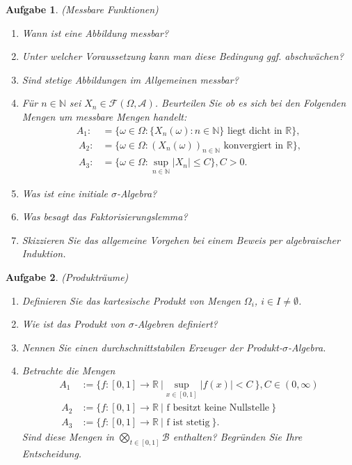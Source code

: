 \documentclass[11pt, a4paper, ngerman]{article}
\newcommand{\N}{\mathbb{N}}
\newcommand{\R}{\mathbb{R}}
\newtheorem{aufgabe}{Aufgabe}
\begin{document}
\begin{aufgabe} (Messbare Funktionen)
    \begin{enumerate}
        \item
        Wann ist eine Abbildung messbar? 
        \item 
        Unter welcher Voraussetzung kann man diese Bedingung ggf. abschwächen? 
        \item 
        Sind stetige Abbildungen im Allgemeinen messbar? 
        \item 
        Für $n \in \N$ sei $X_n \in \mathcal{F}(\Omega, \mathcal{A})$. Beurteilen Sie ob es sich bei den Folgenden Mengen um messbare Mengen handelt: 
        \begin{align*}
            A_1 :&= \{\omega \in \Omega : \{X_n(\omega): n \in \N \} \text{ liegt dicht in } \R \}, \\\
            A_2 :&= \{\omega \in \Omega : (X_n(\omega))_{n \in \N} \text{ konvergiert in } \R \}, \\\
            A_3 :&= \{\omega \in \Omega : \sup_{n \in \N} \lvert X_n \rvert \leq C \}, C > 0. 
        \end{align*}
        \item
        Was ist eine initiale $\sigma$-Algebra?
        \item 
        Was besagt das Faktorisierungslemma? 
        \item 
        Skizzieren Sie das allgemeine Vorgehen bei einem Beweis per algebraischer Induktion. 
    \end{enumerate}
    
\end{aufgabe}

\begin{aufgabe} (Produkträume)
    \begin{enumerate}
        \item
        Definieren Sie das kartesische Produkt von Mengen $\Omega_i$, $i \in I \neq \emptyset$. 
        \item
        Wie ist das Produkt von $\sigma$-Algebren definiert?
        \item 
        Nennen Sie einen durchschnittstabilen Erzeuger der Produkt-$\sigma$-Algebra. 
        \item 
        Betrachte die Mengen 
        \begin{align*}
            A_1 &:= \{f:[0,1] \to \R \ \rvert \sup_{x \in [0,1]} \lvert f(x) \rvert < C \ \}, C \in (0,\infty) \\\
            A_2 &:= \{f:[0,1] \to \R \ \rvert \text{ f besitzt keine Nullstelle} \ \} \\\
            A_3 &:= \{f:[0,1] \to \R \ \rvert \text{ f ist stetig} \ \}. 
        \end{align*}
        Sind diese Mengen in $\bigotimes_{t \in [0,1]} \mathcal{B}$ enthalten? Begründen Sie Ihre Entscheidung. 

            

    \end{enumerate}
\end{aufgabe}
\end{document}

